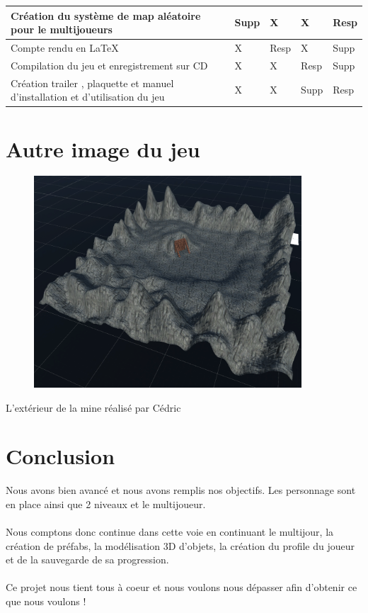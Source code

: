 \documentclass[titlepage, 13px, a4paper]{article}
\begin{document}
{\begin{tabular}{|p{6cm}|p{1.2cm}|p{1.2cm}|p{1.2cm}|p{1.2cm}|}
		\hline
		Création du système de map aléatoire pour le multijoueurs & Supp\footnotemark[2] & X & X & Resp\footnotemark[1] \\
		\hline
		Compte rendu en \LaTeX & X & Resp\footnotemark[1] & X & Supp\footnotemark[2]  \\
		\hline
		Compilation du jeu et enregistrement sur CD & X & X & Resp\footnotemark[1] & Supp\footnotemark[2] \\
		\hline
		Création trailer , plaquette et manuel d'installation et d'utilisation du jeu & X & X & Supp\footnotemark[2] & Resp\footnotemark[1] \\
		\hline
	\end{tabular}
	\label{repartition}		
}

\newpage
\part{Autre image du jeu}
\begin{center}
	\begin{figure}[!hp]
	   \includegraphics[width=10cm]{mine-game.png}
	\end{figure}
	L'extérieur de la mine réalisé par Cédric
\end{center}

\newpage

\part{Conclusion}
Nous avons bien avancé et nous avons remplis nos objectifs.
Les personnage sont en place ainsi que 2 niveaux et le multijoueur.
\\ \\
Nous comptons donc continue dans cette voie en continuant le multijour, la création de préfabs, la modélisation 3D d'objets, 
la création du profile du joueur et de la sauvegarde de sa progression.
\\ \\
Ce projet nous tient tous à coeur et nous voulons nous dépasser afin d'obtenir ce que nous voulons ! 
\end{document}
